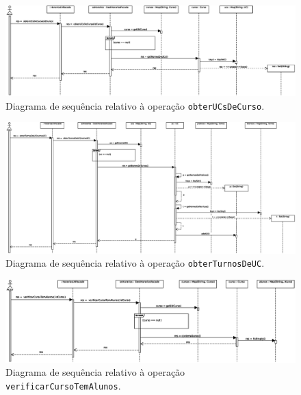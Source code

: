 \documentclass[12pt, a4paper]{article}
\begin{document}
\begin{landscape}
        \begin{figure}[H]
            \centering
            \includegraphics[scale=0.70]{Imagens/Modelos/obterUCsDeCurso.svg.eps}
            \caption{
                Diagrama de sequência relativo à operação \texttt{obterUCsDeCurso}.
            }
        \end{figure}

        \vspace*{\fill}
        \pagebreak
        \vspace*{\fill}

        \begin{figure}[H]
            \centering
            \includegraphics[scale=0.60]{Imagens/Modelos/obterTurnosDeUC.svg.eps}
            \caption{
                Diagrama de sequência relativo à operação \texttt{obterTurnosDeUC}.
            }
        \end{figure}

        \vspace*{\fill}
        \pagebreak
        \vspace*{\fill}

        \begin{figure}[H]
            \centering
            \includegraphics[scale=0.75]{Imagens/Modelos/verificarCursoTemAlunos.svg.eps}
            \caption{
                Diagrama de sequência relativo à operação \texttt{verificarCursoTemAlunos}.
            }
        \end{figure}


\end{landscape}
\end{document}
